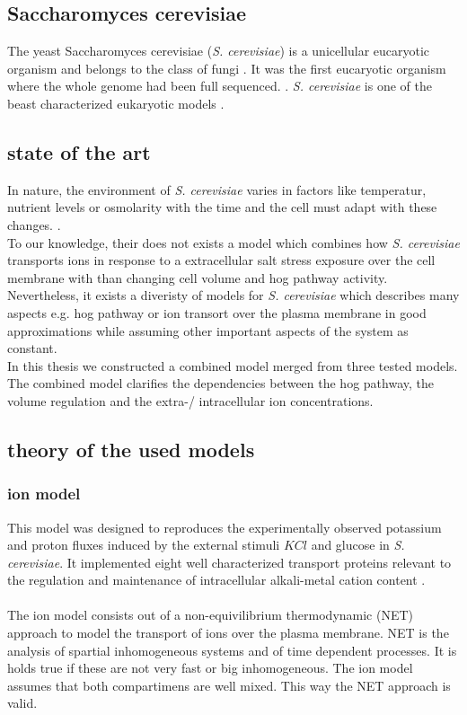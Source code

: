 \subsection{Saccharomyces cerevisiae}
The yeast Saccharomyces cerevisiae (\emph{S. cerevisiae}) is a unicellular eucaryotic organism and belongs to the class of fungi \cite{Feyder2015}. It was the first eucaryotic organism where the whole genome had been full sequenced. \cite{goffeau1996life}. \emph{S. cerevisiae} is one of the beast characterized eukaryotic models \cite{Feyder2015}.


\subsection{state of the art}

In nature, the environment of \emph{S. cerevisiae} varies in factors like temperatur, nutrient levels or osmolarity with the time and the cell must adapt with these changes.  \cite{JannisUhlendorf}. \\To our knowledge, their does not exists a model which combines how \emph{S. cerevisiae} transports ions in response to a extracellular salt stress exposure over the cell membrane with than changing cell volume and hog pathway activity. \\
Nevertheless, it exists a diveristy of models for \emph{S. cerevisiae} which describes many aspects e.g. hog pathway or ion transort over the plasma membrane in good approximations while assuming other important aspects of the system as constant. \\
In this thesis we constructed a combined model merged from three tested models. The combined model clarifies the dependencies between the hog pathway, the volume regulation and the extra-/ intracellular ion concentrations.

\subsection{theory of the used models}
\subsubsection{ion model}
This model was designed to reproduces the experimentally observed potassium and proton fluxes induced by the external stimuli $KCl$ and glucose in \emph{S. cerevisiae}. It implemented eight well characterized transport proteins relevant to the regulation and maintenance of intracellular alkali-metal cation content \cite{Gerber_2016}. \\\\
The ion model consists out of a non-equivilibrium thermodynamic (NET) approach to model the transport of ions over the plasma membrane. NET is the analysis of spartial inhomogeneous systems and of time dependent processes. It is holds true if these are not very fast or big inhomogeneous. The ion model assumes that both compartimens are well mixed. This way the NET approach is valid.\\

